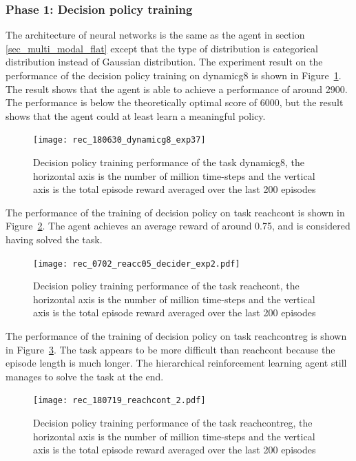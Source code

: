 \subsubsection{Phase 1: Decision policy training}
The architecture of neural networks is the same as the agent in section \ref{sec_multi_modal_flat} except that the type of distribution is categorical distribution instead of Gaussian distribution.
The experiment result on the performance of the decision policy training on dynamicg8 is shown in Figure~\ref{fig:rec_dynamicg8_decider_subt10}. The result shows that the agent is able to achieve a performance of around 2900. The performance is below the theoretically optimal score of 6000, but the result shows that the agent could at least learn a meaningful policy.

\begin{figure}[!htbp]
\centering
\texttt{[image: rec\_180630\_dynamicg8\_exp37]}
\caption{Decision policy training performance of the task dynamicg8, the horizontal axis is the number of million time-steps and the vertical axis is the total episode reward averaged over the last 200 episodes}
\label{fig:rec_dynamicg8_decider_subt10}
\end{figure}

The performance of the training of decision policy on task reachcont is shown in Figure~\ref{fig:rec_reachc05_decider_subt10}. The agent achieves an average reward of around 0.75, and is considered having solved the task.
\begin{figure}[!htbp]
\centering
\texttt{[image: rec\_0702\_reacc05\_decider\_exp2.pdf]}
\caption{Decision policy training performance of the task reachcont, the horizontal axis is the number of million time-steps and the vertical axis is the total episode reward averaged over the last 200 episodes}
\label{fig:rec_reachc05_decider_subt10}
\end{figure}

The performance of the training of decision policy on task reachcontreg is shown in Figure~\ref{rec_reachcontreg}. The task appears to be more difficult than reachcont because the episode length is much longer. The hierarchical reinforcement learning agent still manages to solve the task at the end.
\begin{figure}[!htbp]
	\centering
	\texttt{[image: rec\_180719\_reachcont\_2.pdf]}
	\caption{Decision policy training performance of the task reachcontreg, the horizontal axis is the number of million time-steps and the vertical axis is the total episode reward averaged over the last 200 episodes}
	\label{rec_reachcontreg}
\end{figure}

